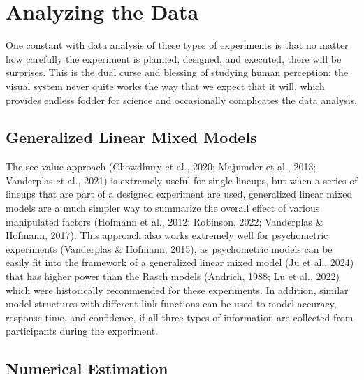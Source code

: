 \documentclass[
  10pt,
  letterpaper,
  DIV=11,
  numbers=noendperiod]{scrartcl}
\begin{document}
\section{Analyzing the Data}\label{sec-analysis}

One constant with data analysis of these types of experiments is that no
matter how carefully the experiment is planned, designed, and executed,
there will be surprises. This is the dual curse and blessing of studying
human perception: the visual system never quite works the way that we
expect that it will, which provides endless fodder for science and
occasionally complicates the data analysis.

\subsection{Generalized Linear Mixed
Models}\label{generalized-linear-mixed-models}

The see-value approach (Chowdhury et al., 2020; Majumder et al., 2013;
Vanderplas et al., 2021) is extremely useful for single lineups, but
when a series of lineups that are part of a designed experiment are
used, generalized linear mixed models are a much simpler way to
summarize the overall effect of various manipulated factors (Hofmann et
al., 2012; Robinson, 2022; Vanderplas \& Hofmann, 2017). This approach
also works extremely well for psychometric experiments (Vanderplas \&
Hofmann, 2015), as psychometric models can be easily fit into the
framework of a generalized linear mixed model (Ju et al., 2024) that has
higher power than the Rasch models (Andrich, 1988; Lu et al., 2022)
which were historically recommended for these experiments. In addition,
similar model structures with different link functions can be used to
model accuracy, response time, and confidence, if all three types of
information are collected from participants during the experiment.

\subsection{Numerical Estimation}\label{numerical-estimation}
\end{document}

